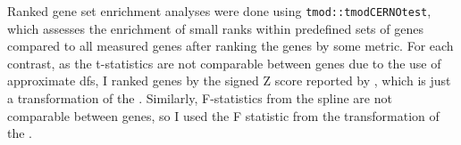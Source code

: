 \begin{outline}
Ranked gene set enrichment analyses were done using \texttt{tmod::tmodCERNOtest}\autocite{weiner3rd2016TmodPackageGeneral}, 
which assesses the enrichment of small ranks within predefined sets of genes compared to all measured genes after ranking the genes by some metric.
For each contrast, 
as the t-statistics are not comparable between genes due to the use of approximate \glspl{df},
I ranked genes by the signed Z score reported by , which is just a transformation of the \pvalue.
Similarly, F-statistics from the spline are not comparable between genes, so I used the F statistic from the transformation of the \pvalue.


\end{outline}
